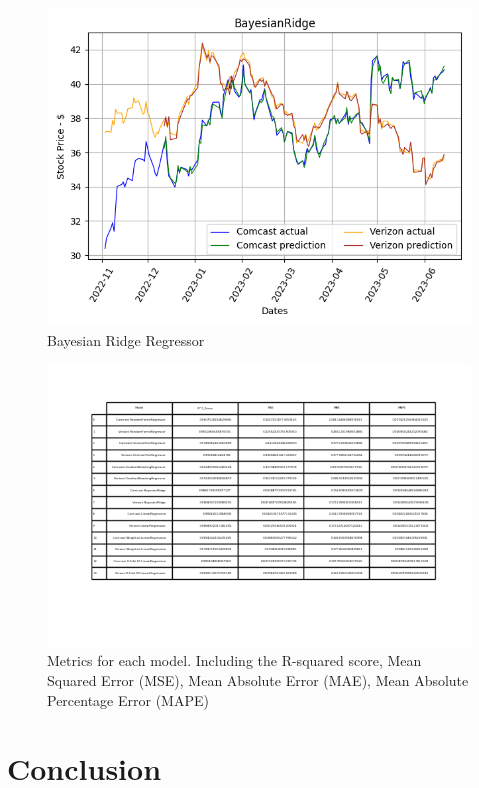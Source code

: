 \documentclass[conference]{IEEEtran}
\begin{document}
\begin{figure}
    \includegraphics[width=\columnwidth]{BayesianRidge}
    \caption{Bayesian Ridge Regressor}
\end{figure}

\begin{figure}
    \includegraphics[width=\columnwidth]{metrics}
    \caption{Metrics for each model. Including the R-squared score, Mean Squared Error (MSE),
    Mean Absolute Error (MAE), Mean Absolute Percentage Error (MAPE)}
\end{figure}


\section{Conclusion}
\end{document}
